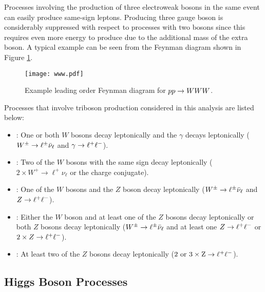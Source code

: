 Processes involving the production of three electroweak bosons in the same
event can easily produce same-sign leptons. Producing three gauge boson is
considerably suppressed with respect to processes with two bosons since this
requires even more energy to produce due to the additional mass of the extra
boson. A typical example can be seen from the Feynman diagram shown in Figure
\ref{fig:feyn_vvv}.
\begin{figure}[tbhp]
\begin{center}
\texttt{[image: www.pdf]}
\caption[Feynman diagram for \WZ]
{\label{fig:feyn_vvv}
Example leading order Feynman diagram for $pp \to \relax{WWW}$.
}
\end{center}
\end{figure}
Processes that involve triboson production considered in this analysis are
listed below:
\begin{itemize}
\item \WWG: One or both $W$ bosons decay leptonically and the $\gamma$ decays leptonically ($\relax{W}^{\pm} \to \ell^{\pm}\bar{\nu}_{\ell}$ and $\gamma\to\ell^+\ell^-$).
\item \WWW: Two of the $W$ bosons with the same sign decay leptonically ($2 \times W^{+} \to \ell^{+}\nu_{\ell}$ or the charge conjugate).
\item \WWZ: One of the $W$ bosons and the $Z$ boson decay leptonically ($\relax{W}^{\pm} \to \ell^{\pm}\bar{\nu}_{\ell}$ and $\relax{Z}\to\ell^+\ell^-$).
\item \WZZ: Either the $W$ boson and at least one of the $Z$ bosons decay leptonically or both $Z$ bosons decay leptonically ($\relax{W}^{\pm} \to \ell^{\pm}\bar{\nu}_{\ell}$ and at least one $\relax{Z}\to\ell^+\ell^-$ or $2 \times \relax{Z}\to\ell^+\ell^-$).
\item \ZZZ: At least two of the $Z$ bosons decay leptonically ($2\ \rm{or}\ 3 \times \relax{Z}\to\ell^+\ell^-$).
\end{itemize}

\subsection{Higgs Boson Processes}
\label{sec:ss_rare_higgs}


